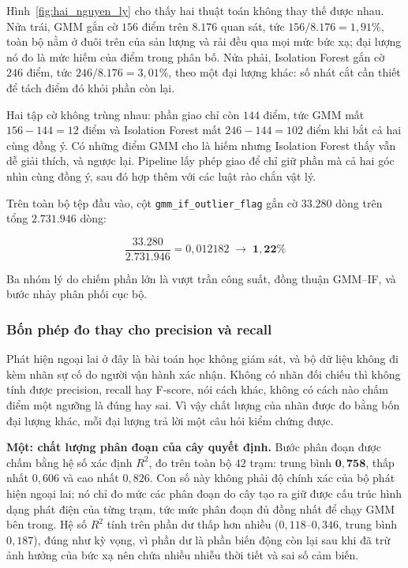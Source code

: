 \documentclass[12pt, a4paper]{report}
\begin{document}
Hình~\ref{fig:hai_nguyen_ly} cho thấy hai thuật toán không thay thế được nhau. Nửa trái, GMM
gắn cờ $156$ điểm trên $8.176$ quan sát, tức $156 / 8.176 = 1{,}91\%$, toàn bộ nằm ở đuôi trên
của sản lượng và rải đều qua mọi mức bức xạ; đại lượng nó đo là mức hiếm của điểm trong phân
bố. Nửa phải, Isolation Forest gắn cờ $246$ điểm, tức $246 / 8.176 = 3{,}01\%$, theo một đại
lượng khác: số nhát cắt cần thiết để tách điểm đó khỏi phần còn lại.

Hai tập cờ không trùng nhau: phần giao chỉ còn $144$ điểm, tức GMM mất
$156 - 144 = 12$ điểm và Isolation Forest mất $246 - 144 = 102$ điểm khi bắt cả hai cùng đồng
ý. Có những điểm GMM cho là hiếm nhưng Isolation Forest thấy vẫn dễ giải thích, và ngược lại.
Pipeline lấy phép giao để chỉ giữ phần mà cả hai góc nhìn cùng đồng ý, sau đó hợp thêm với các
luật rào chắn vật lý.

Trên toàn bộ tệp đầu vào, cột \texttt{gmm\_if\_outlier\_flag} gắn cờ $\mathbf{33.280}$ dòng trên
tổng $\mathbf{2.731.946}$ dòng:

\begin{equation}
\frac{33.280}{2.731.946} = 0{,}012182 \;\longrightarrow\; \mathbf{1{,}22\%}
\end{equation}

Ba nhóm lý do chiếm phần lớn là vượt trần công suất, đồng thuận GMM--IF, và bước nhảy phân
phối cục bộ.

\subsubsection{Bốn phép đo thay cho precision và recall}

Phát hiện ngoại lai ở đây là bài toán học không giám sát, và bộ dữ liệu không đi
kèm nhãn sự cố do người vận hành xác nhận. Không có nhãn đối chiếu thì không tính được
precision, recall hay F-score, nói cách khác, không có cách nào chấm điểm một ngưỡng là
đúng hay sai. Vì vậy chất lượng của nhãn được đo bằng bốn đại lượng khác, mỗi đại lượng trả
lời một câu hỏi kiểm chứng được.

\textbf{Một: chất lượng phân đoạn của cây quyết định.} Bước phân đoạn được chấm bằng hệ
số xác định $R^2$, đo trên toàn bộ $42$ trạm: trung bình $\mathbf{0{,}758}$, thấp nhất
$0{,}606$ và cao nhất $0{,}826$. Con số này không phải độ chính xác của bộ phát
hiện ngoại lai; nó chỉ đo mức các phân đoạn do cây tạo ra giữ được cấu trúc hình dạng phát
điện của từng trạm, tức mức phân đoạn đủ đồng nhất để chạy GMM bên trong. Hệ số $R^2$ tính
trên phần dư thấp hơn nhiều ($0{,}118$--$0{,}346$, trung bình $0{,}187$), đúng như kỳ vọng,
vì phần dư là phần biến động còn lại sau khi đã trừ ảnh hưởng của bức xạ nên chứa nhiều
nhiễu thời tiết và sai số cảm biến.
\end{document}
